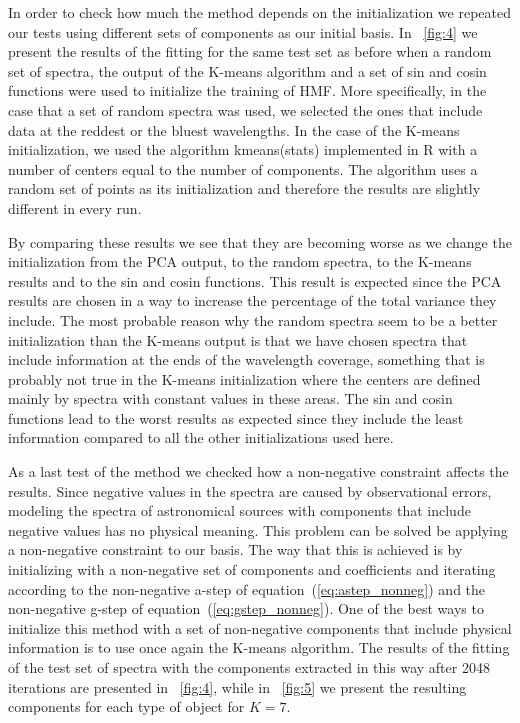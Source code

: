 \documentclass[12pt,preprint]{aastex}
\newcommand{\equationname}{equation}
\begin{document}
In order to check how much the method depends on the initialization we
repeated our tests using different sets of components as our initial
basis. In \figurename~\ref{fig:4} we present the results of the
fitting for the same test set as before when a random set of
spectra, the output of the K-means algorithm and a set of sin and
cosin functions were used to initialize the training of HMF. More specifically, in the
case that a set of random spectra was used, we selected the ones that
include data at the reddest or the bluest wavelengths. In the case of 
the K-means initialization, we used the
algorithm kmeans(stats) implemented in R with a number of centers
equal to the number of components. The algorithm uses a random
set of points as its initialization and therefore the results are
slightly different in every run.

By comparing these results we see that they are becoming worse as we
change the initialization from the PCA output, to the random spectra,
to the K-means results and to the sin and cosin functions. This result
is expected since the PCA results are chosen in a way to increase the
percentage of the total variance they include. The most probable
reason why the random spectra seem to be a better initialization than
the K-means output is that we have chosen spectra that include
information at the ends of the wavelength coverage, something that is
probably not true in the K-means initialization where the centers are
defined mainly by spectra with constant values in these areas. The sin
and cosin functions lead to the worst results as expected since they
include the least information compared to all the other
initializations used here.

As a last test of the method we checked how a non-negative constraint
affects the results. Since negative values in the spectra are caused
by observational errors, modeling the spectra of astronomical sources
with components that include negative values has no physical
meaning. This problem can be solved be applying a non-negative
constraint to our basis. The way that this is achieved is by
initializing with a non-negative set of components and coefficients
and iterating according to the non-negative a-step of
\equationname~(\ref{eq:astep_nonneg}) and the non-negative g-step of
\equationname~(\ref{eq:gstep_nonneg}). One of the best ways to
initialize this method with a set of non-negative components that
include physical information is to use once again the K-means
algorithm. The results of the fitting of the test set of spectra with
the components extracted in this way after 2048 iterations are
presented in \figurename~\ref{fig:4}, while in \figurename~\ref{fig:5}
we present the resulting components for each type of object for $K=7$.
\end{document}
